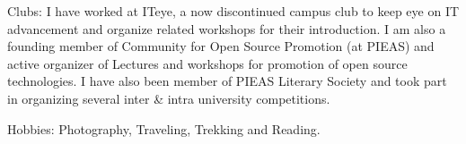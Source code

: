 \documentclass[10pt,letterpaper]{article}
\newenvironment{indentsection}[1]%
{\begin{list}{}%
	{\setlength{\leftmargin}{#1}}%
	\item[]%
}
{\end{list}}
\begin{document}
\begin{indentsection}{\parindent}
\begin{description*}
	\item[Clubs:] I have worked at ITeye, a now discontinued campus club to keep eye on IT advancement and organize related workshops for their introduction. I am also a founding member of Community for Open Source Promotion (at PIEAS) and active organizer of Lectures and workshops for promotion of open source technologies. I have also been member of PIEAS Literary Society and took part in organizing several inter \& intra university competitions.
	\item[Hobbies:]
     Photography, Traveling, Trekking and Reading.
\end{description*}
\end{indentsection}
\end{document}
